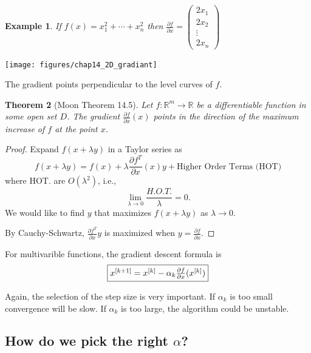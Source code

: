 \documentclass{article}
\newtheorem{theorem}{Theorem}[section]
\newtheorem{example}[theorem]{Example}
\begin{document}
	\begin{example}
		If $f(x) = x_1^2 + \cdots + x_n^2$ then
		\( 
			\frac{\partial  f}{\partial  x} 
				= \begin{pmatrix}
		    		2x_1\\
		    		2x_2\\
		    		\vdots\\
		    		2x_n
		  		  \end{pmatrix}
		\)		
	\end{example}

	\begin{center}
		\texttt{[image: figures/chap14\_2D\_gradiant]}
	\end{center}
	The gradient points perpendicular to the level curves of $f$.	

	\begin{theorem}[Moon Theorem 14.5]
		Let $f:\mathbb{R}^m \to \mathbb{R}$ be a differentiable function in some open set $D$.  The gradient $\frac{\partial  f}{\partial  x}(x)$ points in the direction of the maximum increase of $f$ at the point $x$.		
	\end{theorem}

	\begin{proof}
		Expand $f(x+\lambda y)$ in a Taylor series as
		\[ 
			f(x + \lambda y) = f(x) + \lambda\frac{\partial  f^T}{\partial  x}(x)y + \text{Higher Order Terms (HOT)} 
		\]
		where HOT. are $O(\lambda^2)$, i.e.,
		\[
			\lim_{\lambda \to 0}\frac{H.O.T.}{\lambda} = 0.
		\]	
		We would like to find $y$ that maximizes $f(x + \lambda y)$ as $\lambda \to 0$.

		By Cauchy-Schwartz, $\frac{\partial  f^T}{\partial  x}y$ is maximized when $y = \frac{\partial  f}{\partial  x}$.	
	\end{proof}

	For multivarible functions, the gradient descent formula is
	\[ 
		\fbox{$x^{[k+1]} = x^{[k]} - \alpha_k \frac{\partial f}{\partial x}(x^{[k]})$}
	\]
	
	Again, the selection of the step size is very important.  If $\alpha_k$ is too small convergence will be slow.
	If $\alpha_k$ is too large, the algorithm could be unstable.	
	
\subsection{How do we pick the right $\alpha$?}
	
\end{document}
